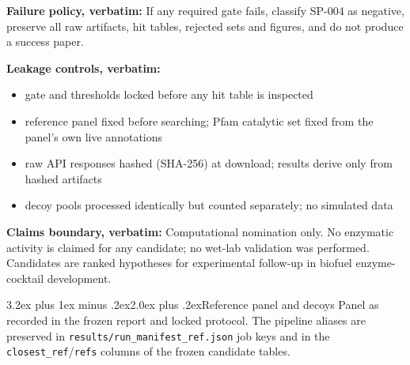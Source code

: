 \documentclass[11pt]{article}
\makeatletter
\renewcommand{\section}{\@startsection{section}{1}{\z@}%
  {3.2ex plus 1ex minus .2ex}{2.0ex plus .2ex}{\Large\bfseries\color{navy}}}
\makeatother
\begin{document}
\textbf{Failure policy, verbatim:} If any required gate fails, classify SP-004 as negative, preserve all raw artifacts, hit tables, rejected sets and figures, and do not produce a success paper.

\textbf{Leakage controls, verbatim:}
\begin{itemize}
\item gate and thresholds locked before any hit table is inspected
\item reference panel fixed before searching; Pfam catalytic set fixed from the panel's own live annotations
\item raw API responses hashed (SHA-256) at download; results derive only from hashed artifacts
\item decoy pools processed identically but counted separately; no simulated data
\end{itemize}

\textbf{Claims boundary, verbatim:} Computational nomination only. No enzymatic activity is claimed for any candidate; no wet-lab validation was performed. Candidates are ranked hypotheses for experimental follow-up in biofuel enzyme-cocktail development.

\section{Reference panel and decoys}
Panel as recorded in the frozen report and locked protocol. The pipeline aliases are preserved in \texttt{results/run\_manifest\_ref.json} job keys and in the \texttt{closest\_ref}/\texttt{refs} columns of the frozen candidate tables.
\end{document}
